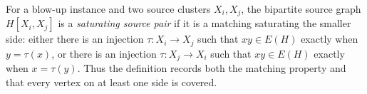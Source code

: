 \begin{definition}
For a blow-up instance and two source clusters $X_i,X_j$, the bipartite source graph $H[X_i,X_j]$ is a \emph{saturating source pair} if it is a matching saturating the smaller side: either there is an injection $\tau:X_i\to X_j$ such that $xy\in E(H)$ exactly when $y=\tau(x)$, or there is an injection $\tau:X_j\to X_i$ such that $xy\in E(H)$ exactly when $x=\tau(y)$.  Thus the definition records both the matching property and that every vertex on at least one side is covered.
\end{definition}
